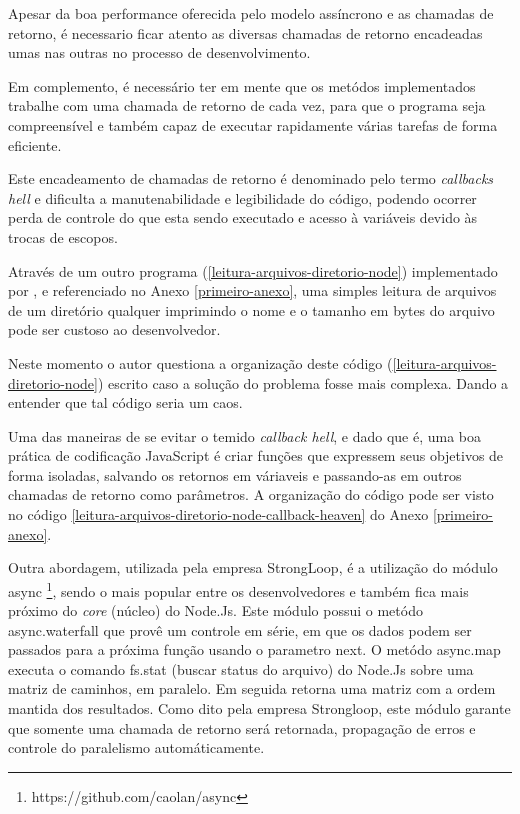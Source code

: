   
  Apesar da boa performance oferecida pelo modelo assíncrono e as chamadas de retorno, é necessario ficar
  atento as diversas chamadas de retorno encadeadas umas nas outras no processo de desenvolvimento. \cite{Pereira:2013} 
  
  Em complemento, é necessário ter em mente que os metódos implementados trabalhe com uma 
  chamada de retorno de cada vez, para que o programa seja compreensível e também capaz de executar rapidamente várias 
  tarefas de forma eficiente.\cite{Hughes:2012}
  
  Este encadeamento de chamadas de retorno é denominado pelo termo \textit{callbacks hell} e dificulta a manutenabilidade e 
  legibilidade do código, podendo ocorrer perda de controle do que esta sendo executado e acesso à variáveis devido às
  trocas de escopos. \cite{Pereira:2013}
  
  Através de um outro programa (\ref{leitura-arquivos-diretorio-node}) implementado por , e referenciado no 
  Anexo \ref{primeiro-anexo}, uma simples leitura de arquivos de um diretório qualquer imprimindo o nome e o tamanho em bytes do arquivo 
  pode ser custoso ao desenvolvedor.
  
  Neste momento o autor questiona a organização deste código (\ref{leitura-arquivos-diretorio-node}) escrito caso a solução do 
  problema fosse mais complexa. Dando a entender que tal código seria um caos.
  
  
  Uma das maneiras de se evitar o temido \textit{callback hell}, e dado que é, uma boa prática de codificação JavaScript é
  criar funções que expressem seus objetivos de forma isoladas, salvando os retornos em váriaveis e passando-as em outros
  chamadas de retorno como parâmetros. A organização do código pode ser visto no código \ref{leitura-arquivos-diretorio-node-callback-heaven} do
  Anexo \ref{primeiro-anexo}.\cite{Pereira:2013}
 
  Outra abordagem, utilizada pela empresa StrongLoop, é a utilização do módulo async \footnote{https://github.com/caolan/async},
  sendo o mais popular entre os desenvolvedores e também fica mais próximo do \textit{core} (núcleo) do Node.Js. Este módulo
  possui o metódo async.waterfall que provê um controle em série, em que os dados podem ser passados para a próxima função
  usando o parametro next. O metódo async.map executa o comando fs.stat (buscar status do arquivo) do Node.Js sobre uma matriz
  de caminhos, em paralelo. Em seguida retorna uma matriz com a ordem mantida dos resultados. Como dito pela empresa
  Strongloop, este módulo garante que somente uma chamada de retorno será retornada, propagação de erros e controle do 
  paralelismo automáticamente. 
  
